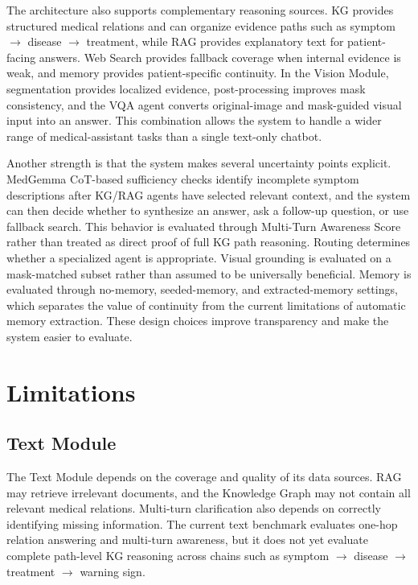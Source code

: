 The architecture also supports complementary reasoning sources. KG provides structured medical relations and can organize evidence paths such as symptom $\rightarrow$ disease $\rightarrow$ treatment, while RAG provides explanatory text for patient-facing answers. Web Search provides fallback coverage when internal evidence is weak, and memory provides patient-specific continuity. In the Vision Module, segmentation provides localized evidence, post-processing improves mask consistency, and the VQA agent converts original-image and mask-guided visual input into an answer. This combination allows the system to handle a wider range of medical-assistant tasks than a single text-only chatbot.

Another strength is that the system makes several uncertainty points explicit. MedGemma CoT-based sufficiency checks identify incomplete symptom descriptions after KG/RAG agents have selected relevant context, and the system can then decide whether to synthesize an answer, ask a follow-up question, or use fallback search. This behavior is evaluated through Multi-Turn Awareness Score rather than treated as direct proof of full KG path reasoning. Routing determines whether a specialized agent is appropriate. Visual grounding is evaluated on a mask-matched subset rather than assumed to be universally beneficial. Memory is evaluated through no-memory, seeded-memory, and extracted-memory settings, which separates the value of continuity from the current limitations of automatic memory extraction. These design choices improve transparency and make the system easier to evaluate.

\section{Limitations}

\subsection{Text Module}

The Text Module depends on the coverage and quality of its data sources. RAG may retrieve irrelevant documents, and the Knowledge Graph may not contain all relevant medical relations. Multi-turn clarification also depends on correctly identifying missing information. The current text benchmark evaluates one-hop relation answering and multi-turn awareness, but it does not yet evaluate complete path-level KG reasoning across chains such as symptom $\rightarrow$ disease $\rightarrow$ treatment $\rightarrow$ warning sign.

